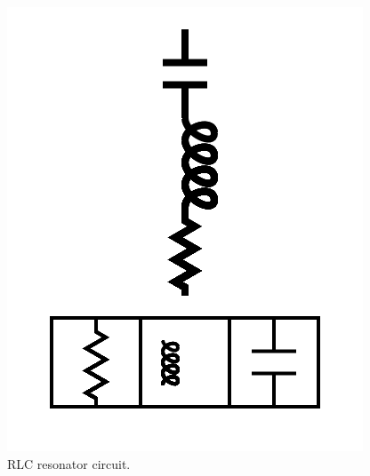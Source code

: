 \documentclass[11pt]{article}
\begin{document}
\begin{figure}

\includegraphics[width=\linewidth]{figures/figure21_rlc.png}

\caption{RLC resonator circuit.}
\end{figure}
\end{document}
